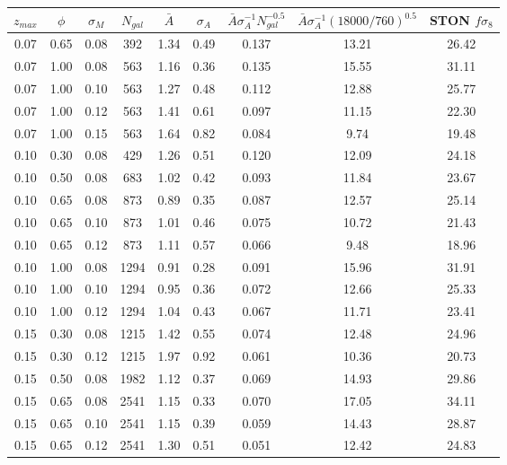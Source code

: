 \documentclass{aastex62}   	%
\begin{document}
\begin{table}
   \centering
   \begin{tabular}{|ccc|ccccc|c|} %
   \hline
$z_{max}$ & $\phi$ & $\sigma_{M}$ & $N_{gal}$ & $\bar{A}$ & $\sigma_A$ & $\bar{A} \sigma_A^{-1} N_{gal}^{-0.5}$ & $\bar{A} \sigma_A^{-1} (18000/760)^{0.5}$&  STON $f\sigma_8$ \\
\hline
0.07 & 0.65 & 0.08 & 392 &   1.34 &   0.49 &  0.137 &  13.21 &  26.42\\
0.07 & 1.00 & 0.08 & 563 &   1.16 &   0.36 &  0.135 &  15.55 &  31.11\\
0.07 & 1.00 & 0.10 & 563 &   1.27 &   0.48 &  0.112 &  12.88 &  25.77\\
0.07 & 1.00 & 0.12 & 563 &   1.41 &   0.61 &  0.097 &  11.15 &  22.30\\
0.07 & 1.00 & 0.15 & 563 &   1.64 &   0.82 &  0.084 &   9.74 &  19.48\\
0.10 & 0.30 & 0.08 & 429 &   1.26 &   0.51 &  0.120 &  12.09 &  24.18\\
0.10 & 0.50 & 0.08 & 683 &   1.02 &   0.42 &  0.093 &  11.84 &  23.67\\
0.10 & 0.65 & 0.08 & 873 &   0.89 &   0.35 &  0.087 &  12.57 &  25.14\\
0.10 & 0.65 & 0.10 & 873 &   1.01 &   0.46 &  0.075 &  10.72 &  21.43\\
0.10 & 0.65 & 0.12 & 873 &   1.11 &   0.57 &  0.066 &   9.48 &  18.96\\
0.10 & 1.00 & 0.08 & 1294 &   0.91 &   0.28 &  0.091 &  15.96 &  31.91\\
0.10 & 1.00 & 0.10 & 1294 &   0.95 &   0.36 &  0.072 &  12.66 &  25.33\\
0.10 & 1.00 & 0.12 & 1294 &   1.04 &   0.43 &  0.067 &  11.71 &  23.41\\
0.15 & 0.30 & 0.08 & 1215 &   1.42 &   0.55 &  0.074 &  12.48 &  24.96\\
0.15 & 0.30 & 0.12 & 1215 &   1.97 &   0.92 &  0.061 &  10.36 &  20.73\\
0.15 & 0.50 & 0.08 & 1982 &   1.12 &   0.37 &  0.069 &  14.93 &  29.86\\
0.15 & 0.65 & 0.08 & 2541 &   1.15 &   0.33 &  0.070 &  17.05 &  34.11\\
0.15 & 0.65 & 0.10 & 2541 &   1.15 &   0.39 &  0.059 &  14.43 &  28.87\\
0.15 & 0.65 & 0.12 & 2541 &   1.30 &   0.51 &  0.051 &  12.42 &  24.83\\

\end{tabular}
\end{table}
\end{document}
